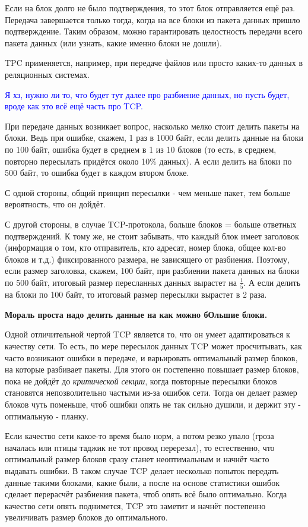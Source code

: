 Если на блок долго не было подтверждения, то этот блок отправляется ещё раз. Передача завершается только тогда, когда на все блоки из пакета данных пришло подтверждение. Таким образом, можно гарантировать целостность передачи всего пакета данных (или узнать, какие именно блоки не дошли).

TPC применяется, например, при передаче файлов или просто каких-то данных в реляционных системах.

\bigskip
\textcolor{blue}{Я хз, нужно ли то, что будет тут далее про разбиение данных, но пусть будет, вроде как это всё ещё часть про TCP.}

При передаче данных возникает вопрос, насколько мелко стоит делить пакеты на блоки. Ведь при ошибке, скажем, 1 раз в 1000 байт, если делить данные на блоки по 100 байт, ошибка будет в среднем в 1 из 10 блоков (то есть, в среднем, повторно пересылать придётся около 10\% данных). А если делить на блоки по 500 байт, то ошибка будет в каждом втором блоке.

С одной стороны, общий принцип пересылки - чем меньше пакет, тем больше вероятность, что он дойдёт. 

С другой стороны, в случае TCP-протокола, больше блоков = больше ответных подтверждений. К тому же, не стоит забывать, что каждый блок имеет заголовок (информация о том, кто отправитель, кто адресат, номер блока, общее кол-во блоков и т.д.) фиксированного размера, не зависящего от разбиения. Поэтому, если размер заголовка, скажем, 100 байт, при разбиении пакета данных на блоки по 500 байт, итоговый размер пересланных данных вырастет на $\frac{1}{5}$. А если делить на блоки по 100 байт, то итоговый размер пересылки вырастет в 2 раза.

\textbf{Мораль проста надо делить данные на как можно бОльшие блоки.}

Одной отличительной чертой TCP является то, что он умеет адаптироваться к качеству сети. То есть, по мере пересылок данных TCP может просчитывать, как часто возникают ошибки в передаче, и варьировать оптимальный размер блоков, на которые разбивает пакеты. Для этого он постепенно повышает размер блоков, пока не дойдёт до \textit{критической секции}, когда повторные пересылки блоков становятся непозволительно частыми из-за ошибок сети. Тогда он делает размер блоков чуть поменьше, чтоб ошибки опять не так сильно душили, и держит эту - оптимальную - планку.

Если качество сети какое-то время было норм, а потом резко упало (гроза началась или птицы таджик не тот провод перерезал), то естественно, что оптимальный размер блоков сразу станет неоптимальным и начнёт часто выдавать ошибки. В таком случае TCP делает несколько попыток передать данные такими блоками, какие были, а после на основе статистики ошибок сделает перерасчёт разбиения пакета, чтоб опять всё было оптимально. Когда качество сети опять поднимется, TCP это заметит и начнёт постепенно увеличивать размер блоков до оптимального.

